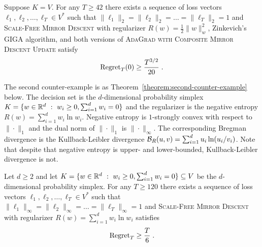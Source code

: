 \begin{theorem}
\label{theorem:first-counter-example}
Suppose $K = V$. For any $T \ge 42$ there exists a sequence of loss vectors $\ell_1, \ell_2, \dots, \ell_T \in V^*$
such that $\|\ell_1\|_2 = \|\ell_2\|_2 = \dots = \|\ell_T\|_2 = 1$ and \textsc{Scale-Free Mirror Descent}
with regularizer $R(w) = \frac{1}{2}\|w\|_w^2$, Zinkevich's \textsc{GIGA} algorithm, and
both versions of \textsc{AdaGrad with Composite Mirror Descent Update} satisfy
$$
\operatorname{Regret}_T(0) \ge \frac{T^{3/2}}{20} \; .
$$
\end{theorem}

The second counter-example is as Theorem~\ref{theorem:second-counter-example}
below.  The decision set is the $d$-dimensional probability simplex $K = \{ w \in \mathbb{R}^d ~:~ w_i
\ge 0, \sum_{i=1}^d w_i = 0 \}$ and the regularizer is the negative entropy
$R(w) = \sum_{i=1}^d w_i \ln w_i$.  Negative entropy is $1$-strongly convex
with respect to $\|\cdot\|_1$ and the dual norm of $\|\cdot\|_1$ is
\mbox{$\|\cdot\|_\infty$}.  The corresponding Bregman divergence is the
Kullback-Leibler divergence $\mathcal{B}_R(u,v) = \sum_{i=1}^d u_i \ln(u_i/v_i)$.
Note that despite that negative entropy is upper- and lower-bounded,
Kullback-Leibler divergence is not.

\begin{theorem}
\label{theorem:second-counter-example}
Let $d \ge 2$ and let $K = \{ w \in \mathbb{R}^d ~:~ w_i \ge 0, \sum_{i=1}^d w_i = 0 \} \subseteq V$ be the $d$-dimensional
probability simplex.
For any $T \ge 120$ there exists a sequence of loss vectors $\ell_1, \ell_2, \dots, \ell_T \in V^*$
such that $\|\ell_1\|_\infty = \|\ell_2\|_\infty = \dots = \|\ell_T\|_\infty = 1$ and \textsc{Scale-Free Mirror Descent}
with regularizer $R(w) = \sum_{i=1}^d w_i \ln w_i$ satisfies
$$
\operatorname{Regret}_T \ge \frac{T}{6} \; .
$$
\end{theorem}


